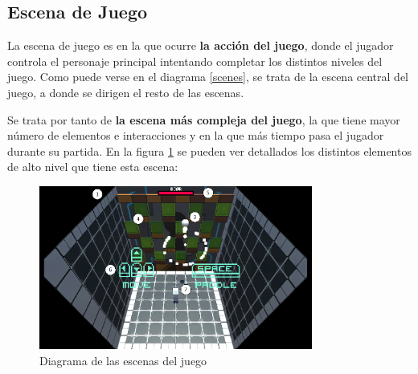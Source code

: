 \subsection{Escena de Juego}
La escena de juego es en la que ocurre \textbf{la acción del juego}, donde el jugador controla el personaje principal intentando completar los distintos niveles del juego. Como puede verse en el diagrama \ref{scenes}, se trata de la escena central del juego, a donde se dirigen el resto de las escenas. 

Se trata por tanto de \textbf{la escena más compleja del juego}, la que tiene mayor número de elementos e interacciones y en la que más tiempo pasa el jugador durante su partida. En la figura \ref{juego_detalles} se pueden ver detallados los distintos elementos de alto nivel que tiene esta escena:

\begin{figure}[h]
	\includegraphics[width=0.8\textwidth]{images/estructura/old/escenas/juego_detalles}
	\centering
	\caption{Diagrama de las escenas del juego}
	\label{juego_detalles}
\end{figure}

